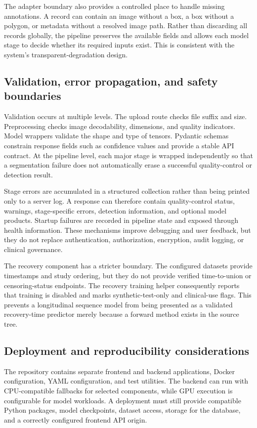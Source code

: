 \documentclass[12pt,a4paper]{article}
\begin{document}
The adapter boundary also provides a controlled place to handle missing annotations. A record can contain an image without a box, a box without a polygon, or metadata without a resolved image path. Rather than discarding all records globally, the pipeline preserves the available fields and allows each model stage to decide whether its required inputs exist. This is consistent with the system's transparent-degradation design.

\subsection{Validation, error propagation, and safety boundaries}
Validation occurs at multiple levels. The upload route checks file suffix and size. Preprocessing checks image decodability, dimensions, and quality indicators. Model wrappers validate the shape and type of tensors. Pydantic schemas constrain response fields such as confidence values and provide a stable API contract. At the pipeline level, each major stage is wrapped independently so that a segmentation failure does not automatically erase a successful quality-control or detection result.

Stage errors are accumulated in a structured collection rather than being printed only to a server log. A response can therefore contain quality-control status, warnings, stage-specific errors, detection information, and optional model products. Startup failures are recorded in pipeline state and exposed through health information. These mechanisms improve debugging and user feedback, but they do not replace authentication, authorization, encryption, audit logging, or clinical governance.

The recovery component has a stricter boundary. The configured datasets provide timestamps and study ordering, but they do not provide verified time-to-union or censoring-status endpoints. The recovery training helper consequently reports that training is disabled and marks synthetic-test-only and clinical-use flags. This prevents a longitudinal sequence model from being presented as a validated recovery-time predictor merely because a forward method exists in the source tree.

\subsection{Deployment and reproducibility considerations}
The repository contains separate frontend and backend applications, Docker configuration, YAML configuration, and test utilities. The backend can run with CPU-compatible fallbacks for selected components, while GPU execution is configurable for model workloads. A deployment must still provide compatible Python packages, model checkpoints, dataset access, storage for the database, and a correctly configured frontend API origin.
\end{document}
